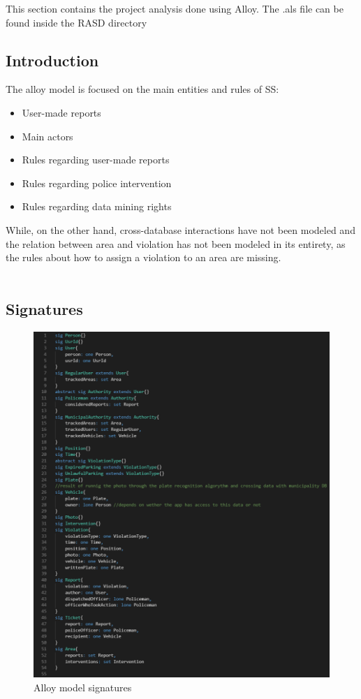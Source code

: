 

This section contains the project analysis done using Alloy. The .als file can be found inside the RASD directory \\
\subsection{Introduction}
The alloy model is focused on the main entities and rules of SS:
\begin{itemize}
	\item User-made reports
	\item Main actors
	\item Rules regarding user-made reports
	\item Rules regarding police intervention
	\item Rules regarding data mining rights
\end{itemize}
While, on the other hand, cross-database interactions have not been modeled and the relation between area and violation has not been modeled in its entirety, as the rules about how to assign a violation to an area are missing.\\  
\\
\newpage
\subsection{Signatures}
\begin{figure}[h!]
	\includegraphics[scale=0.65 ]{Images/Signatures_1-0}
	\caption{Alloy model signatures}
\end{figure}
\newpage

